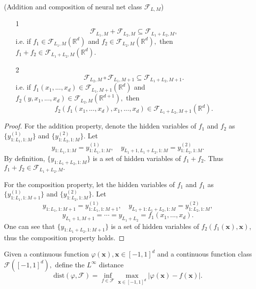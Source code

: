 \begin{properties}\label{prop:net class}
(Addition and composition of neural net class $\mathcal F_{L,M}$)
\begin{itemize}
\item[1]
$$
\mathcal F_{L_1,M} + \mathcal{F}_{L_2,M} \subseteq \mathcal{F}_{L_1+L_2,M},
$$
i.e. if $f_1\in \mathcal F_{L_1,M}(\mathbb{R}^d)$ and $f_2\in \mathcal{F}_{L_2,M}(\mathbb{R}^d),$ then $f_1+f_2\in\mathcal{F}_{L_1+L_2,M}(\mathbb{R}^d)$.
\item[2]
$$
\mathcal F_{L_2,M}\circ \mathcal F_{L_1,M+1} \subseteq \mathcal F_{L_1+L_2,M+1}.
$$ 
i.e. if $f_1(x_1,...,x_d)\in \mathcal{F}_{L_1,M+1}(\mathbb{R}^d)$ and $f_2(y,x_1,...,x_d)\in \mathcal{F}_{L_2,M}(\mathbb{R}^{d+1}),$ then 
$$
f_2(f_1(x_1,...,x_d),x_1,...,x_d)\in \mathcal{F}_{L_1+L_2,M+1}(\mathbb{R}^d).
$$
\end{itemize}
\end{properties}

\begin{proof}
For the addition property, denote the hidden variables of $f_1$ and $f_2$ as $\{y_{1:L_1,1:M}^{(1)}\}$ and $\{y_{1:L_2,1:M}^{(2)}\}$. Let
$$
y_{1:L_1,1:M} = y_{1:L_1,1:M}^{(1)},\quad y_{L_1+1,L_1+L_2,1:M} = y_{1:L_2,1:M}^{(2)}. 
$$
By definition, $\{y_{1:L_1+L_2,1:M}\}$ is a set of hidden variables of $f_1+f_2$. Thus $f_1+f_2\in \mathcal F_{L_1+L_2,M}.$

For the composition property, let the hidden variables of $f_1$ and $f_1$ as $\{y_{1:L_1,1:M+1}^{(1)}\}$ and $\{y_{1:L_2,1:M}^{(2)}\}$. Let
$$
y_{1:L_1,1:M+1} = y_{1:L_1,1:M+1}^{(1)},\quad y_{L_1+1:L_1+L_2,1:M} = y_{1:L_2,1:M}^{(2)},
$$
$$
y_{L_1+1,M+1} =\cdots= y_{L_1+L_2} = f_1(x_1,...,x_d).
$$
One can see that $\{y_{1:L_1+L_2,1:M+1}\}$ is a set of hidden variables of $f_2(f_1(\bm x),\bm x)$, thus the composition property holds.
\end{proof}

\begin{definition}
Given a continuous function $\varphi(\bm{x}),\bm{x} \in [-1,1]^d$ and a continuous function class $\mathcal F([-1,1]^d),$ define the $L^\infty$ distance
$$
\mbox{dist} (\varphi,\mathcal F) = \inf_{f\in \mathcal F} \max_{\bm x \in [-1,1]^d} |\varphi(\bm{x}) - f(\bm{x})|.
$$
\end{definition}

